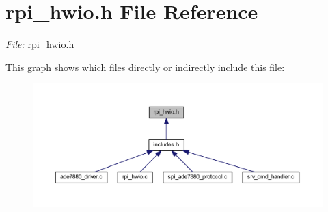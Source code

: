\hypertarget{a00039}{\section{rpi\-\_\-hwio.\-h File Reference}
\label{d3/de7/a00039}
}


{\itshape File\-:} \hyperlink{a00039}{rpi\-\_\-hwio.\-h} \par
  


This graph shows which files directly or indirectly include this file\-:\nopagebreak
\begin{figure}[H]
\begin{center}
\leavevmode
\includegraphics[width=350pt]{d5/de0/a00050}
\end{center}
\end{figure}
